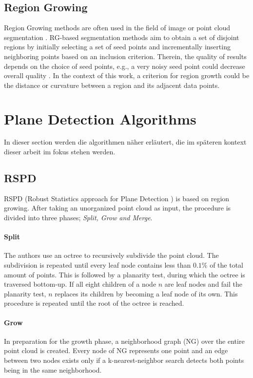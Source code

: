 \documentclass[main.tex]{subfiles}
\begin{document}
\subsection*{Region Growing}
Region Growing methods are often used in the field of image or point cloud segmentation \cite{Proença_Gao_2018, Vo_Truong-Hong_Laefer_Bertolotto_2015}. 
RG-based segmentation methods aim to obtain a set of disjoint regions by initially selecting a set of seed points and incrementally inserting neighboring points based on an inclusion criterion. 
Therein, the quality of results depends on the choice of seed points, e.g., a very noisy seed point could decrease overall quality  \cite{Malek_Rahman_Yasiran_Jumaat_Jalil_2012}.   
In the context of this work, a criterion for region growth could be the distance or curvature between a region and its adjacent data points. 

\section{Plane Detection Algorithms}
In dieser section werden die algorithmen näher erläutert, die im späteren kontext dieser arbeit im fokus stehen werden.

\subsection{RSPD}
RSPD (Robust Statistics approach for Plane Detection \cite{Araújo_Oliveira_2020}) is based on region growing. After taking an unorganized point cloud as input, the procedure is divided into three phases; 
\textit{Split, Grow and Merge}.

\paragraph*{Split}
The authors use an octree to recursively subdivide the point cloud. The subdivision is repeated until every leaf node contains less than $0.1\%$ of the total amount
of points.
This is followed by a planarity test, during which the octree is traversed bottom-up. If all eight children of a node $n$ are leaf nodes and fail the planarity test, $n$ replaces its children
by becoming a leaf node of its own. This procedure is repeated until the root of the octree is reached.
 
\paragraph*{Grow}
In preparation for the growth phase, a neighborhood graph (NG) over the entire point cloud is created. Every node of NG represents one point and an edge between two nodes exists only if
a k-nearest-neighbor search detects both points being in the same neighborhood. 
\end{document}

